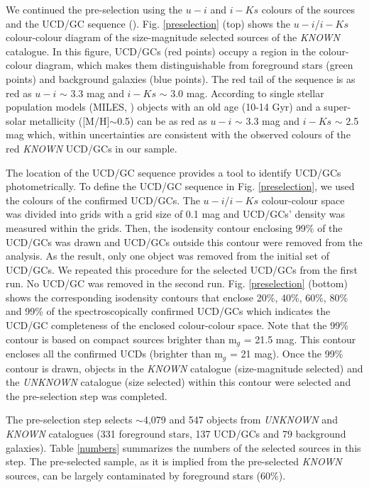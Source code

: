 \documentclass[fleqn,usenatbib]{mnras}
\begin{document}
We continued the pre-selection using the $u-i$ and $i-Ks$ colours of the sources and the UCD/GC sequence (\citealp{Munoz-2014}). Fig. \ref{preselection} (top) shows the $u-i$/$i-Ks$ colour-colour diagram of the size-magnitude selected sources of the \textit{KNOWN} catalogue. In this figure, UCD/GCs (red points) occupy a region in the colour-colour diagram, which makes them distinguishable from foreground stars (green points) and background galaxies (blue points). The red tail of the sequence is as red as $u-i$ $\sim$ 3.3 mag and $i-Ks$ $\sim$ 3.0 mag. According to single stellar population models (MILES, \citealp{vazdekis,vazdekis2016}) objects with an old age (10-14 Gyr) and a super-solar metallicity ([M/H]$\sim$0.5) can be as red as $u-i$ $\sim$ 3.3 mag and $i-Ks$ $\sim$ 2.5 mag which, within uncertainties are consistent with the observed colours of the red \textit{KNOWN} UCD/GCs in our sample.

The location of the UCD/GC sequence provides a tool to identify UCD/GCs photometrically. To define the UCD/GC sequence in Fig. \ref{preselection}, we used the colours of the confirmed UCD/GCs. The $u-i$/$i-Ks$ colour-colour space was divided into grids with a grid size of 0.1 mag and UCD/GCs' density was measured within the grids. Then, the isodensity contour enclosing 99\% of the UCD/GCs was drawn and UCD/GCs outside this contour were removed from the analysis. As the result, only one object was removed from the initial set of UCD/GCs. We repeated this procedure for the selected UCD/GCs from the first run. No UCD/GC was removed in the second run. Fig. \ref{preselection} (bottom) shows the corresponding isodensity contours that enclose 20\%, 40\%, 60\%, 80\% and 99\% of the spectroscopically confirmed UCD/GCs which indicates the UCD/GC completeness of the enclosed colour-colour space. Note that the 99\% contour is based on compact sources brighter than m$_g$ = 21.5 mag. This contour encloses all the confirmed UCDs (brighter than m$_g$ = 21 mag). Once the 99\% contour is drawn, objects in the \textit{KNOWN} catalogue (size-magnitude selected) and the \textit{UNKNOWN} catalogue (size selected) within this contour were selected and the pre-selection step was completed. 

The pre-selection step selects $\sim$4,079 and 547 objects from \textit{UNKNOWN} and \textit{KNOWN} catalogues (331 foreground stars, 137 UCD/GCs and 79 background galaxies). Table \ref{numbers} summarizes the numbers of the selected sources in this step. The pre-selected sample, as it is implied from the pre-selected \textit{KNOWN} sources, can be largely contaminated by foreground stars (60\%). 
\end{document}
